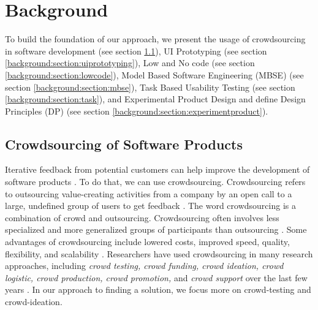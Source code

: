 
\chapter{Background}
\ifpdf
    \graphicspath{{Chapters/Background/Figs/}{Chapters/Background/Figs/}{Chapters/Background/Figs/}}
\else
    \graphicspath{{Chapters/Background/Figs/}{Chapters/Background/Figs/}}
\fi
To build the foundation of our approach, we present the usage of crowdsourcing in software development (see section \ref{background:section:crowdsourcing}), UI Prototyping (see section \ref{background:section:uiprototyping}), Low and No code (see section \ref{background:section:lowcode}), Model Based Software Engineering (MBSE) (see section \ref{background:section:mbse}), Task Based Usability Testing (see section \ref{background:section:task}), and Experimental Product Design and define Design Principles (DP) (see section \ref{background:section:experimentproduct}).

\section{Crowdsourcing of Software Products}
\label{background:section:crowdsourcing}
Iterative feedback from potential customers can help improve the development of software products \cite{article:lean:eric}.
To do that, we can use crowdsourcing.
Crowdsourcing refers to outsourcing value-creating activities from a company by an open call to a large, undefined group of users to get feedback \cite{article:crowdsourcing:leimeister}.
The word crowdsourcing is a combination of crowd and outsourcing.
Crowdsourcing often involves less specialized and more generalized groups of participants than outsourcing \cite{article:crowdsourcing:estelles}.
Some advantages of crowdsourcing include lowered costs, improved speed, quality, flexibility, and scalability \cite{article:crowdsourcing:prpic}.
Researchers have used crowdsourcing in many research approaches, including \textit{crowd testing, crowd funding, crowd ideation, crowd logistic, crowd production, crowd promotion,} and \textit{crowd support} over the last few years \cite{article:crowdsourcing:durward}.
In our approach to finding a solution, we focus more on crowd-testing and crowd-ideation.

